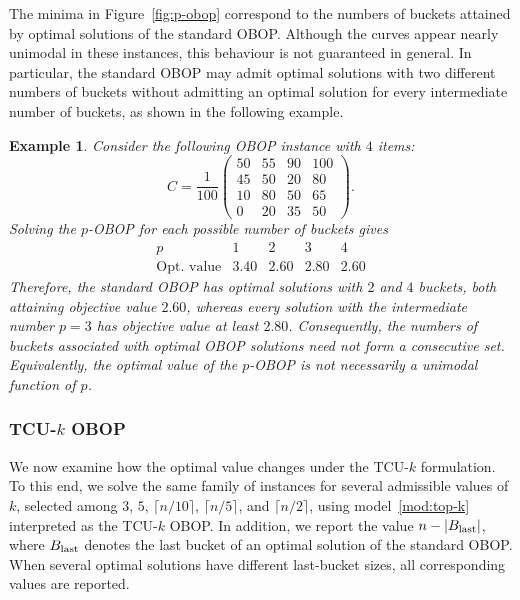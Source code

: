 \documentclass[pdflatex,basic,Numbered]{jnl}%
\theoremstyle{plain}
\newtheorem{example}{Example}
\theoremstyle{remark}
\theoremstyle{thmstyleone}%
\theoremstyle{thmstylethree}%
\begin{document}
The minima in Figure~\ref{fig:p-obop} correspond to the numbers of buckets attained by optimal solutions of the standard {\rm OBOP}. Although the curves appear nearly unimodal in these instances, this behaviour is not guaranteed in general. In particular, the standard {\rm OBOP} may admit optimal solutions with two different numbers of buckets without admitting an optimal solution for every intermediate number of buckets, as shown in the following example.

\begin{example}\label{ex:ejemplo_B}
Consider the following {\rm OBOP} instance with \(4\) items:
\[
C=\frac{1}{100}
\begin{pmatrix}
50 & 55 & 90 & 100 \\
45 & 50 & 20 & 80 \\
10 & 80 & 50 & 65 \\
0 & 20 & 35 & 50
\end{pmatrix}.
\]
Solving the \(p\)-{\rm OBOP} for each possible number of buckets gives
\[
\begin{array}{c|cccc}
p & 1 & 2 & 3 & 4 \\
\hline
\text{Opt. value} & 3.40 & 2.60 & 2.80 & 2.60
\end{array}
\]
Therefore, the standard {\rm OBOP} has optimal solutions with \(2\) and \(4\) buckets, both attaining objective value \(2.60\), whereas every solution with the intermediate number \(p=3\) has objective value at least \(2.80\). Consequently, the numbers of buckets associated with optimal {\rm OBOP} solutions need not form a consecutive set. Equivalently, the optimal value of the \(p\)-{\rm OBOP} is not necessarily a unimodal function of \(p\).
\end{example}

\subsubsection{{\rm TCU}-\texorpdfstring{$k$}{k} {\rm OBOP}}

We now examine how the optimal value changes under the TCU-\(k\) formulation. To this end, we solve the same family of instances for several admissible values of \(k\), selected among \(3\), \(5\), \(\lceil n/10\rceil\), \(\lceil n/5\rceil\), and \(\lceil n/2\rceil\), using model~\eqref{mod:top-k} interpreted as the TCU-\(k\) {\rm OBOP}. In addition, we report the value \(n-|B_{\rm last}|\), where \(B_{\rm last}\) denotes the last bucket of an optimal solution of the standard {\rm OBOP}. When several optimal solutions have different last-bucket sizes, all corresponding values are reported.
\end{document}
